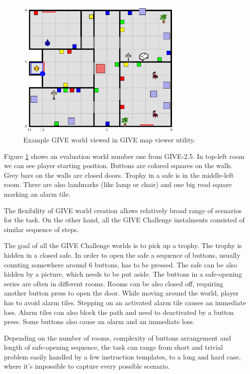 \begin{figure}[h]
  \centering
	\includegraphics[width=0.75\textwidth]{Images/give-evalworldexmaple}
	\caption{Example GIVE world viewed in GIVE map viewer utility.}
	\label{fig:give-evalworldexmaple}
\end{figure}

Figure \ref{fig:give-evalworldexmaple} shows an evaluation world number one from GIVE-2.5. In top-left room we can see player starting position. Buttons are colored squares on the walls. Grey bars on the walls are closed doors. Trophy in a safe is in the middle-left room. There are also landmarks (like lamp or chair) and one big read square marking an alarm tile.

The flexibility of GIVE world creation allows relatively broad range of scenarios for the task. On the other hand, all the GIVE Challenge instalments consisted of similar sequence of steps.

The goal of all the GIVE Challenge worlds is to pick up a trophy. The trophy is hidden in a closed safe. In order to open the safe a sequence of buttons, usually counting somewhere around 6 buttons, has to be pressed. The safe can be also hidden by a picture, which needs to be put aside. The buttons in a safe-opening series are often in different rooms. Rooms can be also closed off, requiring another button press to open the door. While moving around the world, player has to avoid alarm tiles. Stepping on an activated alarm tile causes an immediate loss. Alarm tiles can also block the path and need to deactivated by a button press. Some buttons also cause an alarm and an immediate loss.

Depending on the number of rooms, complexity of buttons arrangement and length of safe-opening sequence, the task can range from short and trivial problem easily handled by a few instruction templates, to a long and hard case, where it's impossible to capture every possible scenario.

